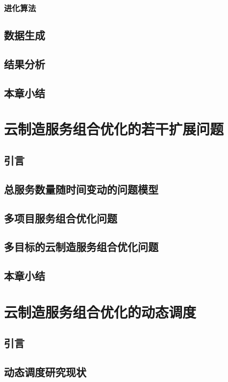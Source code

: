 \documentclass[UTF8]{ctexart}
\begin{document}
		\subsubsection{进化算法}
	\subsection{数据生成}
	\subsection{结果分析}
	\subsection{本章小结}

\section{云制造服务组合优化的若干扩展问题}
	\subsection{引言}
	\subsection{总服务数量随时间变动的问题模型}
	\subsection{多项目服务组合优化问题}
	\subsection{多目标的云制造服务组合优化问题}
	\subsection{本章小结}

\newpage

\section{云制造服务组合优化的动态调度}
	\subsection{引言}
	\subsection{动态调度研究现状}
\end{document}
